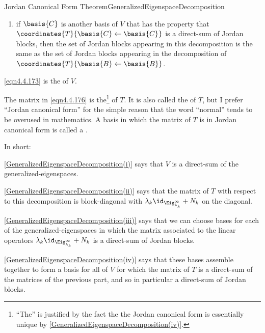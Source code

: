 \begin{thm}{Jordan Canonical Form Theorem}{GeneralizedEigenspaceDecomposition}
\begin{enumerate}
		\item \label{GeneralizedEigenspaceDecomposition(v)}if $\basis{C}$ is another basis of $V$ that has the property that $\coordinates{T}{\basis{C}\leftarrow \basis{C}}$ is a direct-sum of Jordan blocks, then the set of Jordan blocks appearing in this decomposition is the same as the set of Jordan blocks appearing in the decomposition of $\coordinates{T}{\basis{B}\leftarrow \basis{B}}$.
	\end{enumerate}
	\begin{rmk}
		\eqref{eqn4.4.173} is the  of $V$.
	\end{rmk}
	\begin{rmk}
		The matrix in \eqref{eqn4.4.176} is the\footnote{``The'' is justified by the fact the the Jordan canonical form is essentially unique by \cref{GeneralizedEigenspaceDecomposition(iv)}.}  of $T$.  It is also called the  of $T$, but I prefer ``Jordan canonical form'' for the simple reason that the word ``normal'' tends to be overused in mathematics.  A basis in which the matrix of $T$ is in Jordan canonical form is called a \index{Jordan basis}.
	\end{rmk}
	\begin{rmk}
		In short:
		
		\cref{GeneralizedEigenspaceDecomposition(i)} says that $V$ is a direct-sum of the generalized-eigenspaces.
		
		\cref{GeneralizedEigenspaceDecomposition(ii)} says that the matrix of $T$ with respect to this decomposition is block-diagonal with $\lambda _k\id _{\Eig _{\lambda _k}^{\infty}}+N_k$ on the diagonal.
		 
		\cref{GeneralizedEigenspaceDecomposition(iii)} says that we can choose bases for each of the generalized-eigenspaces in which the matrix associated to the linear operators $\lambda _k\id _{\Eig _{\lambda _k}^{\infty}}+N_k$ is a direct-sum of Jordan blocks.
		 
		\cref{GeneralizedEigenspaceDecomposition(iv)} says that these bases assemble together to form a basis for all of $V$ for which the matrix of $T$ is a direct-sum of the matrices of the previous part, and so in particular a direct-sum of Jordan blocks.
		

\end{rmk}
\end{thm}
